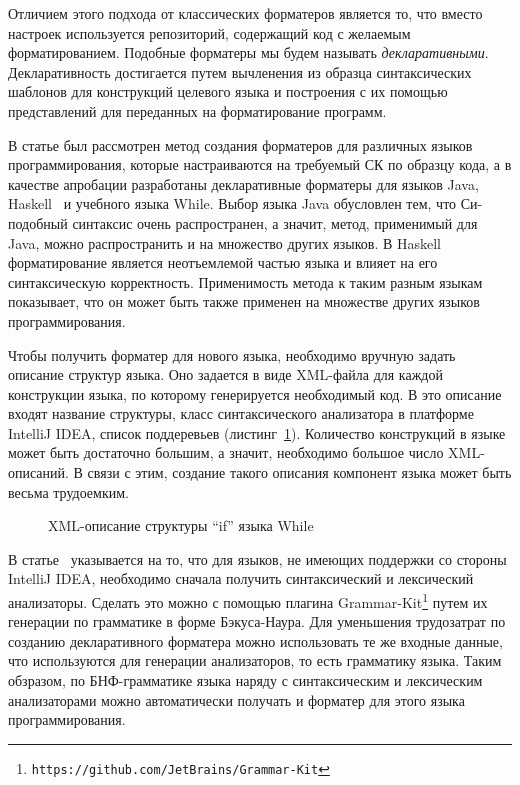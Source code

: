 \documentclass[conference]{IEEEtran}
\begin{document}
Отличием этого подхода от классических форматеров является то, что вместо настроек используется репозиторий, содержащий код с желаемым форматированием.
Подобные форматеры мы будем называть \emph{декларативными}.
Декларативность достигается путем вычленения из образца синтаксических шаблонов для конструкций целевого языка и построения с их помощью представлений для переданных на форматирование программ.

В статье был рассмотрен метод создания форматеров для различных языков программирования, которые настраиваются на требуемый СК по образцу кода, а в качестве апробации разработаны декларативные форматеры для языков Java, Haskell~\cite{korDiploma} и учебного языка While.
Выбор языка Java обусловлен тем, что Си-подобный синтаксис очень распространен, а значит, метод, применимый для Java, можно распространить и на множество других языков.
В Haskell форматирование является неотъемлемой частью языка и влияет на его синтаксическую корректность. 
Применимость метода к таким разным языкам показывает, что он может быть также применен на множестве других языков программирования.

Чтобы получить форматер для нового языка, необходимо вручную задать описание структур языка.
Оно задается в виде XML-файла для каждой конструкции языка, по которому генерируется необходимый код.
В это описание входят название структуры, класс синтаксического анализатора в платформе IntelliJ IDEA, список поддеревьев (листинг~\ref{fig:whileXml}).
Количество конструкций в языке может быть достаточно большим, а значит, необходимо большое число XML-описаний.
В связи с этим, создание такого описания компонент языка может быть весьма трудоемким.

\begin{figure}[h]
	\centering
	
	\caption{XML-описание структуры ``if'' языка While}
	\label{fig:whileXml}
\end{figure}


В статье~\cite{while} указывается на то, что для языков, не имеющих поддержки со стороны IntelliJ IDEA, необходимо сначала получить синтаксический и лексический анализаторы.
Сделать это можно с помощью плагина Grammar-Kit\footnote{\texttt{https://github.com/JetBrains/Grammar-Kit}} путем их генерации по грамматике в форме Бэкуса-Наура.
Для уменьшения трудозатрат по созданию декларативного форматера можно использовать те же входные данные, что используются для генерации анализаторов, то есть грамматику языка.
Таким обзразом, по БНФ-грамматике языка наряду с синтаксическим и лексическим анализаторами можно автоматически получать и форматер для этого языка программирования.
\end{document}

